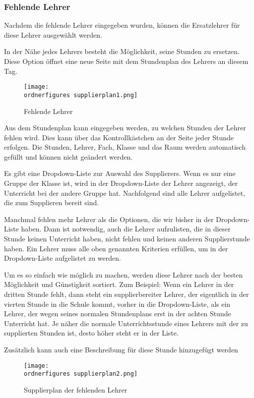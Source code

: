\subsubsection{Fehlende Lehrer}
Nachdem die fehlende Lehrer eingegeben wurden, können die Ersatzlehrer für diese Lehrer ausgewählt werden.

In der Nähe jedes Lehrers besteht die Möglichkeit, seine Stunden zu ersetzen. Diese Option öffnet eine neue Seite mit dem Stundenplan des Lehrers an diesem Tag.

\begin{figure}[H]
	\centering
	\texttt{[image: \\ordnerfigures supplierplan1.png]}
	\caption{Fehlende Lehrer}
	\label{fi:fehlendeLehrer}
\end{figure}

Aus dem Stundenplan kann eingegeben werden, zu welchen Stunden der Lehrer fehlen wird. Dies kann über das Kontrollkästchen an der Seite jeder Stunde erfolgen. Die Stunden, Lehrer, Fach, Klasse und das Raum werden automatisch gefüllt und können nicht geändert werden.

Es gibt eine Dropdown-Liste zur Auswahl des Supplierers. Wenn es nur eine Gruppe der Klasse ist, wird in der Dropdown-Liste der Lehrer angezeigt, der Unterricht bei der andere Gruppe hat. Nachfolgend sind alle Lehrer aufgelistet, die zum Supplieren bereit sind. 

Manchmal fehlen mehr Lehrer als die Optionen, die wir bisher in der Dropdown-Liste haben. Dann ist notwendig, auch die Lehrer aufzulisten, die in dieser Stunde keinen Unterricht haben, nicht fehlen und keinen anderen Supplierstunde haben. Ein Lehrer muss alle oben genannten Kriterien erfüllen, um in der Dropdown-Liste aufgelistet zu werden.

Um es so einfach wie möglich zu machen, werden diese Lehrer nach der besten Möglichkeit und Günstigkeit sortiert. Zum Beispiel:  Wenn ein Lehrer in der dritten Stunde fehlt, dann steht ein supplierbereiter Lehrer, der eigentlich in der vierten Stunde in die Schule kommt, vorher in die Dropdown-Liste, als ein Lehrer, der wegen seines normalen Stundenplans erst in der achten Stunde Unterricht hat. Je näher die normale Unterrichtsstunde eines Lehrers mit der zu supplierten Stunden ist, desto höher steht er in der Liste.

Zusätzlich kann auch eine Beschreibung für diese Stunde hinzugefügt werden

\begin{figure}[H]
	\centering
	\texttt{[image: \\ordnerfigures supplierplan2.png]}
	\caption{Supplierplan der fehlenden Lehrer}
	\label{fi:supplieren}
\end{figure} 

